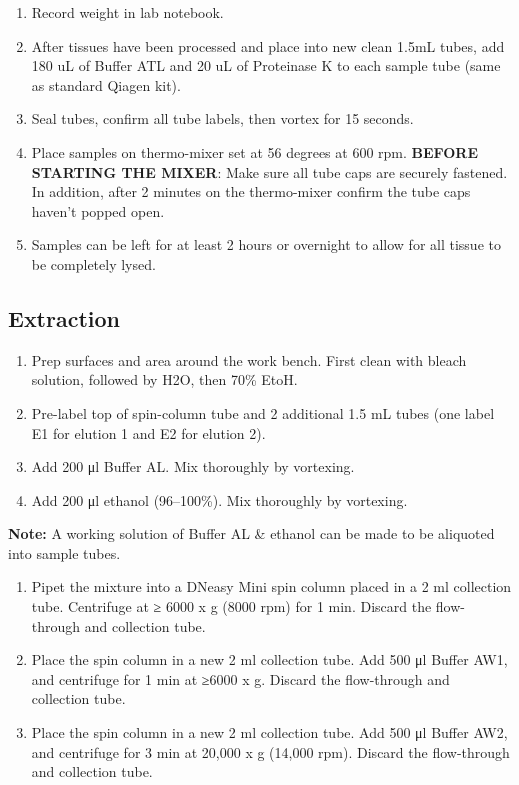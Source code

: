 \documentclass[
  letterpaper,
  DIV=11,
  numbers=noendperiod]{scrreprt}
\begin{document}
\begin{enumerate}
\def\labelenumi{\arabic{enumi}.}
\item
  Record weight in lab notebook.
\item
  After tissues have been processed and place into new clean 1.5mL
  tubes, add 180 uL of Buffer ATL and 20 uL of Proteinase K to each
  sample tube (same as standard Qiagen kit).
\item
  Seal tubes, confirm all tube labels, then vortex for 15 seconds.
\item
  Place samples on thermo-mixer set at 56 degrees at 600 rpm.
  \textbf{BEFORE STARTING THE MIXER}: Make sure all tube caps are
  securely fastened. In addition, after 2 minutes on the thermo-mixer
  confirm the tube caps haven't popped open.
\item
  Samples can be left for at least 2 hours or overnight to allow for all
  tissue to be completely lysed.
\end{enumerate}

\hypertarget{extraction}{%
\subsection*{\texorpdfstring{\textbf{Extraction}}{Extraction}}\label{extraction}}

\begin{enumerate}
\def\labelenumi{\arabic{enumi}.}
\item
  Prep surfaces and area around the work bench. First clean with bleach
  solution, followed by H2O, then 70\% EtoH.
\item
  Pre-label top of spin-column tube and 2 additional 1.5 mL tubes (one
  label E1 for elution 1 and E2 for elution 2).
\item
  Add 200 μl Buffer AL. Mix thoroughly by vortexing.
\item
  Add 200 μl ethanol (96--100\%). Mix thoroughly by vortexing.
\end{enumerate}

\textbf{Note:} A working solution of Buffer AL \& ethanol can be made to
be aliquoted into sample tubes.

\begin{enumerate}
\def\labelenumi{\arabic{enumi}.}
\item
  Pipet the mixture into a DNeasy Mini spin column placed in a 2 ml
  collection tube. Centrifuge at ≥ 6000 x g (8000 rpm) for 1 min.
  Discard the flow-through and collection tube.
\item
  Place the spin column in a new 2 ml collection tube. Add 500 μl Buffer
  AW1, and centrifuge for 1 min at ≥6000 x g. Discard the flow-through
  and collection tube.
\item
  Place the spin column in a new 2 ml collection tube. Add 500 μl Buffer
  AW2, and centrifuge for 3 min at 20,000 x g (14,000 rpm). Discard the
  flow-through and collection tube.
\end{enumerate}
\end{document}
